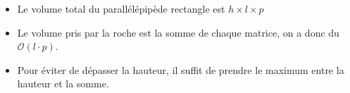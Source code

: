 \begin{frame}
    \frametitle{\problemtitle}
    \begin{itemize}
        \item<+-> Le volume total du parallélépipède rectangle est $h\times l\times p$
        \item<+-> Le volume pris par la roche est la somme de chaque matrice, on a donc du $\mathcal{O}(l\cdot p)$.
        \item<+-> Pour éviter de dépasser la hauteur, il suffit de prendre le maximum entre la hauteur et la somme.
    \end{itemize}
\end{frame}
